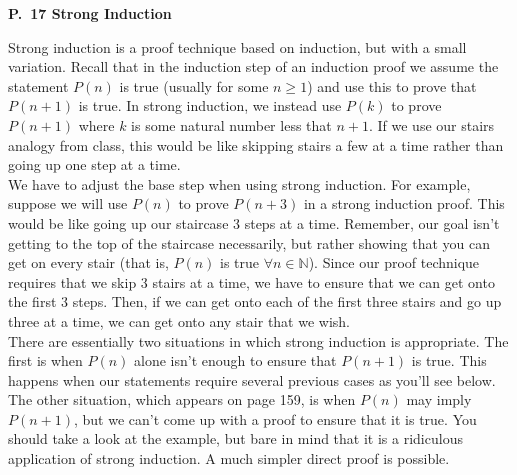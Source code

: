 \documentclass[12 pt]{article}
\newcommand{\N}{\mathbb{N}}
\theoremstyle{definition}
\theoremstyle{plain}
\theoremstyle{mytheorem}
\theoremstyle{myexample}
\theoremstyle{mydefinition}
\begin{document}
\begin{center}
\textbf{P.~17 Strong Induction}
\end{center}

\begin{center}
\end{center}

\noindent  Strong induction is a proof technique based on induction, but with a small variation.  Recall that in the induction step of an induction proof we assume the statement $P(n)$ is true (usually for some $n \geq 1$) and use this to prove that $P(n+1)$ is true.  In strong induction, we instead use $P(k)$ to prove $P(n+1)$ where $k$ is some natural number less that $n+1$.  If we use our stairs analogy from class, this would be like skipping stairs a few at a time rather than going up one step at a time.  \\

We have to adjust the base step when using strong induction.  For example, suppose we will use $P(n)$ to prove $P(n+3)$ in a strong induction proof.  This would be like going up our staircase 3 steps at a time.  Remember, our goal isn't getting to the top of the staircase necessarily, but rather showing that you can get on every stair (that is, $P(n)$ is true $\forall n \in \N$).  Since our proof technique requires that we skip 3 stairs at a time, we have to ensure that we can get onto the first 3 steps.  Then, if we can get onto each of the first three stairs and go up three at a time, we can get onto any stair that we wish.\\

There are essentially two situations in which strong induction is appropriate.  The first is when $P(n)$ alone isn't enough to ensure that $P(n+1)$ is true.  This happens when our statements require several previous cases as you'll see below.  The other situation, which appears on page 159, is when $P(n)$ may imply $P(n+1)$, but we can't come up with a proof to ensure that it is true.  You should take a look at the example, but bare in mind that it is a ridiculous application of strong induction.  A much simpler direct proof is possible.
\end{document}
